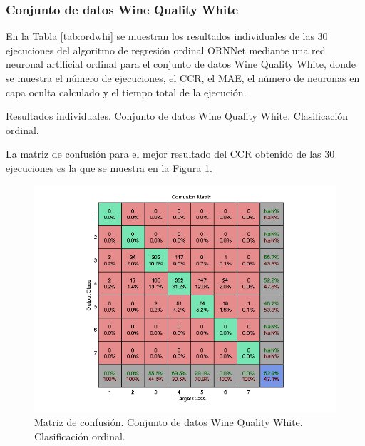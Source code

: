 			\subsubsection{Conjunto de datos Wine Quality White}
			
			En la Tabla \ref{tab:ordwhi} se muestran los resultados individuales de las 30 ejecuciones del algoritmo de regresión ordinal ORNNet mediante una red neuronal artificial ordinal para el conjunto de datos Wine Quality White, donde se muestra el número de ejecuciones, el CCR, el MAE, el número de neuronas en capa oculta calculado y el tiempo total de la ejecución.\\
			
			\begin{table}[!htbp]
				\centering
				\caption{Resultados individuales. Conjunto de datos Wine Quality White. Clasificación ordinal.}
				\label{tab:ordwhi}
			\end{table}
			
			La matriz de confusión para el mejor resultado del CCR obtenido de las 30 ejecuciones es la que se muestra en la Figura \ref{fig:ordwhi}.
			
			\begin{figure}[htbp]
				\centering
				\includegraphics[scale=0.8]{../src/results/ordinal/winequality-white_mc1.png}
				\caption{Matriz de confusión. Conjunto de datos Wine Quality White. Clasificación ordinal.}
				\label{fig:ordwhi}
			\end{figure}
			
